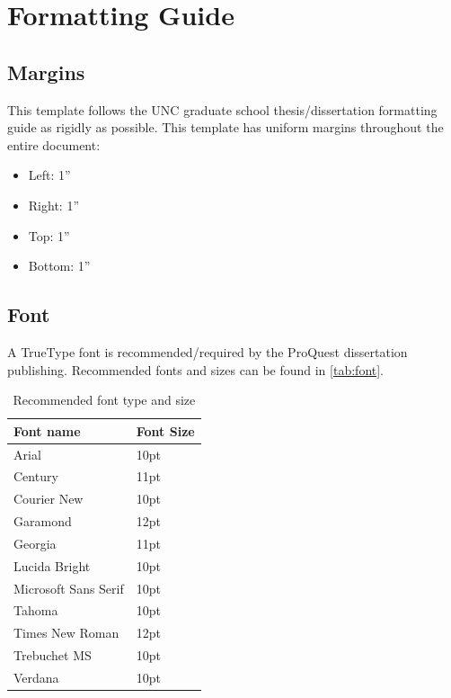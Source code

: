 \chapter{Formatting Guide}
\label{chap:formatting_guide}

\section{Margins}

This template follows the UNC graduate school thesis/dissertation formatting guide as rigidly as possible.
This template has uniform margins throughout the entire document:
\begin{itemize}
    \item Left: 1''
    \item Right: 1''
    \item Top: 1''
    \item Bottom: 1''
\end{itemize}

\section{Font}
A TrueType font is recommended/required by the ProQuest dissertation publishing. Recommended fonts and sizes can be found in \autoref{tab:font}.

\begin{table}
    \centering
    \caption{Recommended font type and size}\label{tab:font}
    \begin{tabular}{ll}
        \toprule
        Font name            & Font Size \\ \midrule
        Arial                & 10pt\\
        Century              & 11pt\\
        Courier New          & 10pt\\
        Garamond             & 12pt\\
        Georgia              & 11pt\\
        Lucida Bright        & 10pt\\
        Microsoft Sans Serif & 10pt\\
        Tahoma               & 10pt\\
        Times New Roman      & 12pt\\
        Trebuchet MS         & 10pt\\
        Verdana              & 10pt\\ \bottomrule
    \end{tabular}
\end{table}

